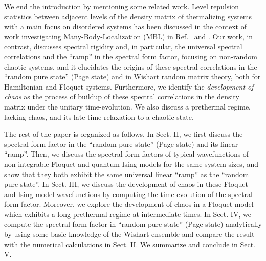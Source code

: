 \documentclass[aps,prb,preprint,onecolumn,amsmath,amssymb,superscriptaddress,eqsecnum,floatfix,scrartcl]{revtex4-1}
\begin{document}
We end the introduction by mentioning some  related work. Level repulsion statistics between adjacent levels of the density matrix 
of thermalizing systems with a 
main focus
on disordered systems has been  discussed  in the context of work investigating  Many-Body-Localization (MBL) in Ref.\ 
and .
Our work, in contrast, discusses spectral rigidity and, in particular,  the universal spectral correlations
and the ``ramp'' in the spectral form factor, focusing on non-random chaotic systems, and
it elucidates the origins of
these spectral correlations 
 in the ``random pure state'' (Page state)  and  in  Wishart random matrix theory, both for Hamiltonian and Floquet systems. Furthermore,
we identify the 
{\it development  of chaos}
as the process of buildup
of these spectral correlations in the density matrix under the unitary time-evolution.
We also discuss a prethermal regime, lacking chaos, and its late-time relaxation to a chaotic state.

The rest of the paper is organized as follows. In Sect. II, we first discuss the spectral form factor in the  ``random pure state'' (Page state)
 and
its
 linear ``ramp''. Then, we discuss the spectral form factors of typical
 wavefunctions of  non-integrable  Floquet and quantum  Ising models
for the same system sizes,  and show that they both exhibit  the same universal  linear ``ramp''
as the ``random pure state''.
 In Sect. III, we discuss the 
development of chaos
 in these Floquet and Ising model wavefunctions by computing the time evolution of the spectral form factor.
Moreover, 
we explore the 
development  of chaos
 in  a Floquet model 
which exhibits  a long prethermal regime at intermediate times. In Sect. IV, we compute the spectral form factor in ``random pure state'' 
(Page state) analytically by using some basic knowledge of the Wishart ensemble and compare the result with the numerical calculations  in Sect. II. We summarize and conclude in Sect. V.







\end{document}
